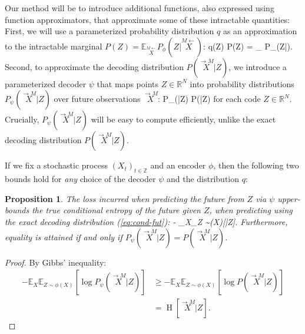 \documentclass[entropy,article,submit,moreauthors,pdftex,10pt,a4paper]{Definitions/mdpi}
\newcommand{\E}[0]{\mathbb{E}}
\newtheorem{proposition}[theorem]{Proposition}
\newcommand{\finitefuture}{\stackrel{\rightarrow \scriptscriptstyle{M}}{X}}
\newcommand{\finitepast}{\stackrel{\scriptscriptstyle{M}\leftarrow}{X}}%
\let\oldequation\equation
\let\oldendequation\endequation
\renewenvironment{equation}
  {\linenomathNonumbers\oldequation}
  {\oldendequation\endlinenomath}
\begin{document}
Our method will be to introduce additional functions, also expressed using function approximators, that approximate some of these intractable quantities:
First, we will use a parameterized probability distribution $q$ as an approximation to the intractable marginal $P(Z) = \E_{\finitepast} P_\phi(Z|\finitepast)$:
\begin{equation}
q(Z)  P(Z) = \E_{\finitepast} P_\phi(Z|\finitepast).
\end{equation}
Second, to approximate the decoding distribution $P(\finitefuture|Z)$, we introduce a parameterized decoder $\psi$ that maps points $Z \in \mathbb{R}^N$  into probability distributions $P_\psi(\finitefuture|Z)$ over future observations $\finitefuture$:
\begin{equation}
P_\psi(\finitefuture|Z)    P(\finitefuture|Z)
\end{equation}
for each code $Z \in \mathbb{R}^N$. Crucially, $P_\psi(\finitefuture|Z)$ will be easy to compute efficiently, unlike the exact decoding distribution $P(\finitefuture|Z)$.

If we fix a stochastic process $(X_t)_{t \in \mathbb{Z}}$ and an encoder $\phi$, then the following two bounds hold for \emph{any} choice of the decoder $\psi$ and the distribution $q$:

\begin{proposition}
\label{prop:mi-bound}
The loss incurred when predicting the future from $Z$ via $\psi$ upper-bounds the true conditional entropy of the future given $Z$, when predicting using the exact decoding distribution (\ref{eq:cond-fut}):
\begin{equation}\label{ineq1}
	-	_{X}_{Z \sim \phi(X)}\left[\log P_\psi(\finitefuture | Z)\right] \geq {}[\finitefuture|Z].
\end{equation}
Furthermore, equality is attained if and only if $P_\psi(\finitefuture|Z) = P(\finitefuture|Z)$. %
\end{proposition}

\begin{proof}
By Gibbs' inequality:
\begin{align*}
	-	\mathbb{E}_{X}\mathbb{E}_{Z \sim \phi(X)}\left[\log P_\psi(\finitefuture | Z)\right] & \geq -	\mathbb{E}_{X}\mathbb{E}_{Z \sim \phi(X)}\left[\log P(\finitefuture | Z)\right]\\
	&= \operatorname{H}[\finitefuture|Z].
\end{align*}
\end{proof}
\end{document}
